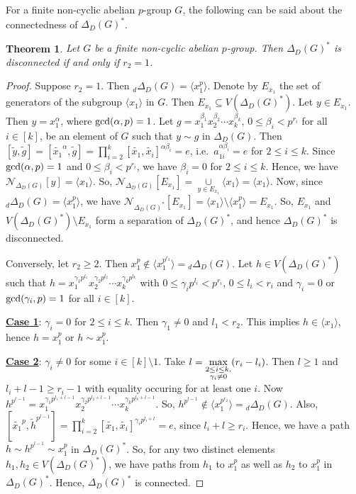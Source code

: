\documentclass[12pt,a4paper]{article}
\newtheorem{theorem}{Theorem}[section]
\begin{document}
For a finite non-cyclic abelian $p$-group $G$, the following can be said about the connectedness of $\Delta_D(G)^*$.


\begin{theorem}\label{connectivity_abelian_p}
Let $G$ be a finite non-cyclic abelian $p$-group. Then $\Delta_D(G)^*$ is disconnected if and only if $r_2=1$.
\end{theorem}

\begin{proof}
Suppose $r_2=1$. Then $_d\Delta_D(G)=\langle x_1^p\rangle$. Denote by $E_{x_1}$ the set of generators of the subgroup $\langle x_1\rangle$ in $G$. Then $E_{x_1}\subseteq{V(\Delta_D(G)^*)}$. Let $y\in E_{x_1}$. Then $y=x_1^{\alpha}$, where ${\rm gcd}({\alpha},p)=1$. Let $g=x_1^{\beta_1}x_2^{\beta_2}\cdots x_k^{\beta_k}$, $0\leq\beta_i<p^{r_i}$ for all $i\in[k]$, be an element of $G$ such that $y\sim g$ in $\Delta_D(G)$. Then $[\tilde{y},\tilde{g}]=[\tilde{x_1}^{\alpha},\tilde{g}]=\prod_{i=2}^k[\tilde{x_1},\tilde{x_i}]^{\alpha\beta_i}=e$, i.e.~$a_{1i}^{\alpha\beta_i}=e$ for $2\leq i\leq k$. Since ${\rm gcd}({\alpha},p)=1$ and $0\leq\beta_i<p^{r_i}$, we have $\beta_i=0$ for $2\leq i\leq k$. Hence, we have $\mathcal{N}_{\Delta_D(G)}[y]=\langle x_1\rangle$. So, $\mathcal{N}_{\Delta_D(G)}[E_{x_1}]=\underset{y\in E_{x_1}}{\cup}\langle x_1\rangle=\langle x_1\rangle$. Now, since $_d\Delta_D(G)=\langle x_1^p\rangle$, we have $\mathcal{N}_{\Delta_D(G)^*}[E_{x_1}]=\langle x_1\rangle\setminus\langle x_1^p\rangle=E_{x_1}.$ So, $E_{x_1}$ and $V(\Delta_D(G)^*)\setminus E_{x_1}$ form a separation of $\Delta_D(G)^*$, and hence $\Delta_D(G)^*$ is disconnected. 

Conversely, let $r_2\geq 2$. Then $x_1^p\notin \langle x_1^{p^{r_2}}\rangle={_d}\Delta_D(G)$. Let $h\in V(\Delta_D(G)^*)$ such that $h=x_1^{\gamma_1p^{l_1}}x_2^{\gamma_2p^{l_2}}\cdots x_k^{\gamma_kp^{l_k}}$ with $0\leq\gamma_ip^{l_i}<p^{r_i}$, $0\leq l_i< r_i$ and $\gamma_i=0$ or ${\rm gcd}(\gamma_i,p)=1$ for all $i\in [k]$. 

\noindent\textbf{\underline{Case 1}}: $\gamma_i=0$ for $2\leq i\leq k$. Then $\gamma_1\neq 0$ and $l_1< r_2$. This implies $h\in \langle x_1\rangle$, hence $h= x_1^p$ or $h\sim x_1^p$. 

\noindent\textbf{\underline{Case 2}}: $\gamma_i\neq 0$ for some $i\in [k]\setminus 1$. Take $l=\underset{\substack{2\leq i\leq k,\\\gamma_i\neq 0}}{\rm max}(r_i-l_i)$. Then $l\geq 1$ and $l_i+l-1\geq r_i-1$ with equality occuring for at least one $i$. Now $h^{p^{l-1}}=x_1^{\gamma_1p^{l_1+l-1}}x_2^{\gamma_2p^{l_2+l-1}}\cdots x_k^{\gamma_kp^{l_k+l-1}}$. So, $h^{p^{l-1}}\notin \langle x_1^{p^{r_2}}\rangle={_d}\Delta_D(G)$. Also, $[\tilde{x_1}^p,\tilde{h}^{p^{l-1}}]=\prod_{i=2}^k[\tilde{x_1},\tilde{x_i}]^{\gamma_ip^{l_i+l}}=e$, since $l_i+l\geq r_i$. Hence, we have a path $h\sim h^{p^{l-1}}\sim x_1^p$ in $\Delta_D(G)^*$. So, for any two distinct elements $h_1,h_2\in V(\Delta_D(G)^*)$, we have paths from $h_1$ to $x_1^p$ as well as $h_2$ to $x_1^p$ in $\Delta_D(G)^*$. Hence, $\Delta_D(G)^*$ is connected. 
\end{proof}
\end{document}
